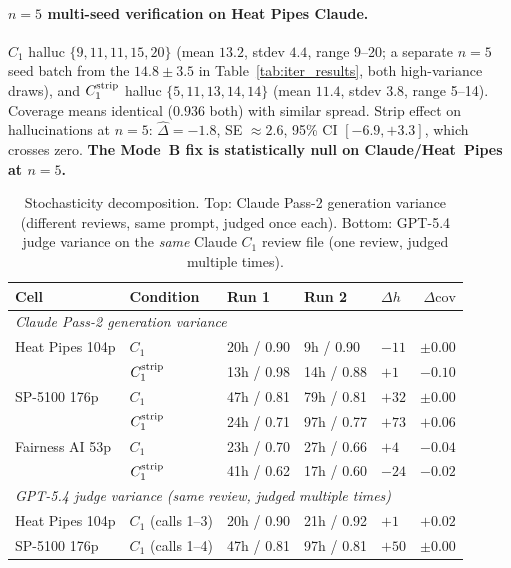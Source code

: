 \documentclass[11pt]{article}
\begin{document}
\paragraph{$n{=}5$ multi-seed verification on Heat Pipes Claude.} $C_1$ halluc $\{9,11,11,15,20\}$ (mean $13.2$, stdev $4.4$, range 9--20; a separate $n{=}5$ seed batch from the $14.8{\pm}3.5$ in Table~\ref{tab:iter_results}, both high-variance draws), and $C_1^{\rm strip}$ halluc $\{5,11,13,14,14\}$ (mean $11.4$, stdev $3.8$, range 5--14). Coverage means identical ($0.936$ both) with similar spread. Strip effect on hallucinations at $n{=}5$: $\hat{\Delta}=-1.8$, SE $\approx 2.6$, 95\% CI $[-6.9, +3.3]$, which crosses zero. \textbf{The Mode~B fix is statistically null on Claude/Heat~Pipes at $n{=}5$.}

\begin{table}[h]
\centering
\caption{Stochasticity decomposition. Top: Claude Pass-2 generation variance (different reviews, same prompt, judged once each). Bottom: GPT-5.4 judge variance on the \emph{same} Claude $C_1$ review file (one review, judged multiple times).}
\label{tab:claude_stochasticity_appdx}
\small
\begin{tabular}{lllllr}
\toprule
Cell & Condition & Run 1 & Run 2 & $\Delta h$ & $\Delta \mathrm{cov}$ \\
\midrule
\multicolumn{6}{l}{\emph{Claude Pass-2 generation variance}} \\
Heat Pipes 104p     & $C_1$           & 20h / 0.90 & 9h  / 0.90 & $-11$ & $\pm 0.00$ \\
                    & $C_1^{\rm strip}$ & 13h / 0.98 & 14h / 0.88 & $+1$  & $-0.10$ \\
SP-5100 176p        & $C_1$           & 47h / 0.81 & 79h / 0.81 & $+32$ & $\pm 0.00$ \\
                    & $C_1^{\rm strip}$ & 24h / 0.71 & 97h / 0.77 & $+73$ & $+0.06$ \\
Fairness AI 53p     & $C_1$           & 23h / 0.70 & 27h / 0.66 & $+4$  & $-0.04$ \\
                    & $C_1^{\rm strip}$ & 41h / 0.62 & 17h / 0.60 & $-24$ & $-0.02$ \\
\midrule
\multicolumn{6}{l}{\emph{GPT-5.4 judge variance (same review, judged multiple times)}} \\
Heat Pipes 104p     & $C_1$ (calls 1--3) & 20h / 0.90 & 21h / 0.92 & $+1$ & $+0.02$ \\
SP-5100 176p        & $C_1$ (calls 1--4) & 47h / 0.81 & 97h / 0.81 & $+50$ & $\pm 0.00$ \\
\bottomrule
\end{tabular}
\end{table}
\end{document}
